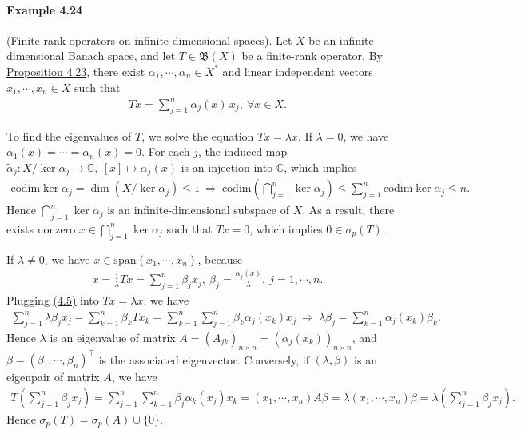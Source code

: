 \documentclass{article}
\begin{document}
\paragraph{Example 4.24\label{example:4.24}} (Finite-rank operators on infinite-dimensional spaces). Let $X$ be an infinite-dimensional Banach space, and let $T\in\mathfrak{B}(X)$ be a finite-rank operator. By \hyperref[prop:4.23]{Proposition 4.23}, there exist $\alpha_1,\cdots,\alpha_n\in X^*$ and linear independent vectors $x_1,\cdots,x_n\in X$ such that
\begin{align*}
	Tx = \sum_{j=1}^n\alpha_j(x)\,x_j,\ \forall x\in X.
\end{align*}

To find the eigenvalues of $T$, we solve the equation $Tx=\lambda x$. If $\lambda=0$, we have $\alpha_1(x)=\cdots=\alpha_n(x)=0$. For each $j$, the induced map $\tilde{\alpha}_j:X/\ker\alpha_j\to\mathbb{C},\ [x]\mapsto \alpha_j(x)$ is an injection into $\mathbb{C}$, which implies
\begin{align*}
	\mathrm{codim} \ker\alpha_j=\dim(X/\ker\alpha_j)\leq 1\ \Rightarrow\ \mathrm{codim}\left(\bigcap_{j=1}^n\ker\alpha_j\right)\leq\sum_{j=1}^n\mathrm{codim}\ker\alpha_j\leq n.
\end{align*}
Hence $\bigcap_{j=1}^n\ker\alpha_j$ is an infinite-dimensional subspace of $X$. As a result, there exists nonzero $x\in\bigcap_{j=1}^n\ker\alpha_j$ such that $Tx=0$, which implies $0\in\sigma_p(T)$. \vspace{0.1cm}

If $\lambda\neq 0$, we have $x\in\mathrm{span}\left\{x_1,\cdots,x_n\right\}$, because
\begin{align*}
	x = \frac{1}{\lambda} Tx = \sum_{j=1}^n \beta_j x_j,\ \beta_j = \frac{\alpha_j(x)}{\lambda},\ j=1,\cdots,n.\tag{4.5}\label{eq:4.5}
\end{align*}
Plugging \hyperref[eq:4.5]{(4.5)} into $Tx=\lambda x$, we have
\begin{align*}
	 \sum_{j=1}^n\lambda\beta_j x_j = \sum_{k=1}^n \beta_k Tx_k = \sum_{k=1}^n\sum_{j=1}^n\beta_k\alpha_j(x_k) x_j\ \Rightarrow\ \lambda\beta_j = \sum_{k=1}^n\alpha_j(x_k)\beta_k.
\end{align*}
Hence $\lambda$ is an eigenvalue of matrix $A=(A_{jk})_{n\times n}=\left(\alpha_j(x_k)\right)_{n\times n}$, and $\beta=(\beta_1,\cdots,\beta_n)^\top$ is the associated eigenvector. Conversely, if $(\lambda,\beta)$ is an eigenpair of matrix $A$, we have
\begin{align*}
	T\left(\sum_{j=1}^n\beta_j x_j\right) = \sum_{j=1}^n\sum_{k=1}^n\beta_j\alpha_k(x_j)x_k = \left(x_1,\cdots,x_n\right)A\beta = \lambda\left(x_1,\cdots,x_n\right)\beta = \lambda\left(\sum_{j=1}^n\beta_j x_j\right).
\end{align*}
Hence $\sigma_p(T)=\sigma_p(A)\cup\{0\}$.
\end{document}
